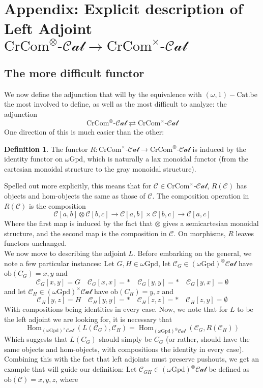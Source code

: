 \documentclass[12pt]{article}
\theoremstyle{definition}
\newtheorem{definition}[theorem]{Definition}
\newcommand{\C}{\mathcal{C}}
\newcommand{\stinfty}{\omega\text{Gpd}}
\newcommand{\crcom}{\text{CrCom}}
\newcommand{\graycatzero}{(\stinfty)^\otimes\mathcal{Cat}}
\newcommand{\cartesiancatzero}{(\stinfty)^\times\mathcal{Cat}}
\newcommand{\cartcrossedcat}{\crcom^\times\text{-}\mathcal{Cat}}
\newcommand{\tensorcrossedcat}{\crcom^\otimes\text{-}\mathcal{Cat}}
\newcommand{\ob}{\text{ob}}
\newcommand{\forgetcartesian}{R}
\newcommand{\forcecartesian}{L}
\DeclareMathOperator{\Hom}{Hom}
\begin{document}
\section{Appendix: Explicit description of Left Adjoint $\tensorcrossedcat \to \cartcrossedcat$}
	\subsection{The more difficult functor}
		We now define the adjunction that will by the equivalence with $(\omega,1)-\text{Cat}$.be the most involved to define, as well as the most difficult to analyze: the adjunction 
		$$\tensorcrossedcat \rightleftarrows \cartcrossedcat$$
		One direction of this is much easier than the other: 
		\begin{definition}
			The functor $\forgetcartesian : \cartcrossedcat \to \tensorcrossedcat$ is induced by the identity functor on $\stinfty$, which is naturally a lax monoidal functor (from the cartesian monoidal structure to the gray monoidal structure). 
		\end{definition}
		Spelled out more explicitly, this means that for $\C \in \cartcrossedcat$, $\forgetcartesian(\C)$ has objects and hom-objects the same as those of $\C$. The composition operation in $\forgetcartesian(\C)$ is the composition
		$$\C[a,b] \otimes \C[b,c] \to \C[a,b] \times \C[b,c] \to \C[a,c]$$
		Where the first map is induced by the fact that $\otimes$ gives a semicartesian monoidal structure, and the second map is the composition in $\C$. On morphisms, $\forgetcartesian$ leaves functors unchanged.
		\\
		\indent We now move to describing the adjoint $\forcecartesian$. 
		Before embarking on the general, we note a few particular instances: 
		Let $G,H \in \stinfty$, let $\C_G \in \graycatzero$ have $\ob(C_G) = {x,y}$ and 
		$$\C_G[x,y] = G \quad \C_G[x,x] = * \quad \C_G[y,y] = * \quad \C_G[y,x] = \emptyset$$
		and let $\C_H \in \cartesiancatzero$ have $\ob(C_H) = {y,z}$ and 
		$$\C_H[y,z] = H \quad \C_H[y,y] = * \quad \C_H[z,z] = * \quad \C_H[z,y] = \emptyset$$
		With compositions being identities in every case.
		Now, we note that for $\forcecartesian$ to be the left adjoint we are looking for, it is necessary that
		$$\Hom_{\cartesiancatzero}(\forcecartesian(\C_G), \C_H) = \Hom_{\graycatzero}(\C_G, \forgetcartesian(\C_H)) $$
		Which suggests that $\forcecartesian(C_G)$ should simply be $C_G$ (or rather, should have the same objects and hom-objects, with compositions the identity in every case). Combining this with the fact that left adjoints must preserve pushouts, we get an example that will guide our definition: Let $\C_{GH} \in \graycatzero$ be defined as $\ob(\C) = {x,y,z}$, where
\end{document}
